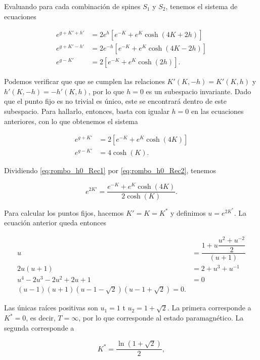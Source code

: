 \documentclass[10pt]{article}
\begin{document}
Evaluando para cada combinaci\'on de spines $S_1$ y $S_2$, tenemos el sistema de ecuaciones

\begin{align}
e^{g+K'+h'} &= 2e^{h}\left[e^{-K} + e^K\cosh(4K+2h) \right] \label{eq:rombo_Rec1}\\
e^{g+K'-h'} &= 2e^{-h}\left[e^{-K} + e^K\cosh(4K-2h) \right]\label{eq:rombo_Rec2} \\
e^{g-K'} &= 2\left[ e^{-K} + e^K \cosh(2h) \right]. \label{eq:rombo_Rec3}
\end{align}

Podemos verificar que que se cumplen las relaciones $K'(K, -h) = K'(K, h)$ y $h'(K, -h) = -h'(K, h)$, por lo que $h=0$ es un subespacio invariante. Dado que el punto fijo es no trivial es \'unico, este se encontrar\'a dentro de este subespacio. Para hallarlo, entonces, basta con igualar $h = 0$ en las ecuaciones anteriores, con lo que obtenemos el sistema

\begin{align}
e^{g+K'} &= 2\left[e^{-K} + e^K\cosh(4K) \right] \label{eq:rombo_h0_Rec1}\\
e^{g-K'} &= 4\cosh(K). \label{eq:rombo_h0_Rec2}
\end{align}

Dividiendo  \ref{eq:rombo_h0_Rec1} por \ref{eq:rombo_h0_Rec2}, tenemos

\begin{equation} \label{eq:rombo_Rk}
e^{2K'} = \dfrac{e^{-K} + e^K\cosh(4K)}{2\cosh(K)}.
\end{equation}

Para calcular los puntos fijos, hacemos $K'=K=K^*$ y definimos $u=e^{2K^*}$. La ecuaci\'on anterior queda entonces 

\begin{align}
u &= \dfrac{1 + u\dfrac{u^2 + u^{-2}}{2}}{(u+1)} \\
2 u (u+1) &= 2 + u^3 + u^{-1} \\
u^4 - 2 u^3 - 2u^2 + 2u + 1 &= 0 \\
(u-1)(u+1)(u-1-\sqrt{2})(u-1+\sqrt{2}) = 0.
\end{align}

Las \'unicas ra\'ices positivas son $u_1 = 1$ t $u_2 = 1+\sqrt{2}$. La primera corresponde a $K^* = 0$, es decir, $T=\infty$, por lo que corresponde al estado paramagn\'etico. La segunda corresponde a 

\begin{equation}
K^* = \dfrac{\ln(1+\sqrt{2})}{2},
\end{equation}
\end{document}
